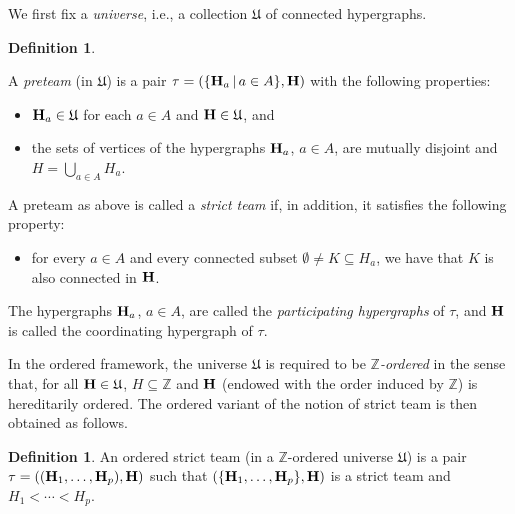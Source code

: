 \documentclass{article}
\theoremstyle{plain}
\theoremstyle{definition}
\newtheorem{definition}[thm]{Definition}
\newcommand{\inc}{\subseteq}
\newcommand{\Union}{\bigcup}
\newcommand{\hyper}[1]{{\bf #1}}
\begin{document}
 We first fix a {\em universe}, i.e., a collection $\mathfrak{U}$ of connected hypergraphs. 
\begin{definition}\label{ost}


A {\em preteam} (in $\mathfrak{U}$) is a pair $\tau=(\{\hyper{H}_a\,|\, a\in A\},\hyper{H})$ with the following properties:
\begin{itemize}
\item[(1)] ${\bf H}_a\in \mathfrak{U}$ for each $a\in A$ and ${\bf H}\in {\mathfrak{U}}$, and
\item[(2)] the sets of vertices of the hypergraphs ${\bf H}_a$, $a\in A$, are mutually disjoint and $H=\Union_{a\in A}H_a$.
\end{itemize}
A preteam as above is called a {\em strict team} if, in addition, it satisfies the following property:
\begin{itemize}
\item[(S)] for every $a\in A$ and every connected subset $\emptyset\neq K\inc H_a$, we have that $K$ is also connected in $\hyper{H}$. 
\end{itemize} The hypergraphs ${\bf H}_a$, $a\in A$, are called the {\em participating hypergraphs} of $\tau$, and ${\bf H}$ is called the coordinating hypergraph of $\tau$.
\end{definition}

 In the ordered framework, the universe $\mathfrak{U}$ is required to be {\em $\mathbb{Z}$-ordered} in the sense that, for all $\hyper{H}\in\mathfrak{U}$, $H\inc\mathbb{Z}$ and $\hyper{H}$ (endowed with the order induced by 
$\mathbb{Z}$) is hereditarily ordered. The ordered variant of the notion of strict team is then obtained as follows. 

\begin{definition}\label{orderedteam}
 An ordered strict team (in a $\mathbb{Z}$-ordered universe ${\mathfrak U}$) is a pair $\tau=(({\bf H}_1,\dots,{\bf H}_p),\hyper{H})$ such that $(\{{\bf H}_1,\dots,{\bf H}_p\},\hyper{H})$ is a strict team and $H_1<\cdots<H_p$. 
\end{definition}
\end{document}
